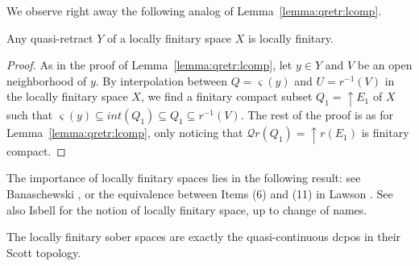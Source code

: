 \documentclass{LMCS}
\newcommand\Smyth{\mathcal Q}
\newcommand\upc{\mathop{\uparrow}\nolimits}
\newcommand{\interior}[1]{int ({#1})} \newcommand{\biginterior}[1]{\interior{#1}}
\newcommand\qs{\varsigma}
\begin{document}
We observe right away the following analog of
Lemma~\ref{lemma:qretr:lcomp}.
\begin{lem}
  \label{lemma:qretr:lfin}
  Any quasi-retract $Y$ of a locally finitary space $X$ is locally
  finitary.
\end{lem}
\begin{proof}
  As in the proof of Lemma~\ref{lemma:qretr:lcomp}, let $y \in Y$ and
  $V$ be an open neighborhood of $y$.  By interpolation between $Q =
  \qs (y)$ and $U = r^{-1} (V)$ in the locally finitary space $X$, we
  find a finitary compact subset $Q_1 = \upc E_1$ of $X$ such that
  $\qs (y) \subseteq \interior {Q_1} \subseteq Q_1 \subseteq r^{-1}
  (V)$.  The rest of the proof is as for
  Lemma~\ref{lemma:qretr:lcomp}, only noticing that $\Smyth r (Q_1) =
  \upc r (E_1)$ is finitary compact.
\end{proof}
The importance of locally finitary spaces lies in the following
result: see Banaschewski \cite{Banaschewski:essn:ext}, or the
equivalence between Items (6) and (11) in Lawson
\cite[Theorem~2]{Lawson:T0:pw:conv}.  See also Isbell
\cite{Isbell:meetcont} for the notion of locally finitary space, up to
change of names.
\begin{prop}
  \label{prop:locfin=qcont}
  The locally finitary sober spaces are exactly the quasi-continuous dcpos in their Scott
  topology.
\end{prop}
\end{document}
